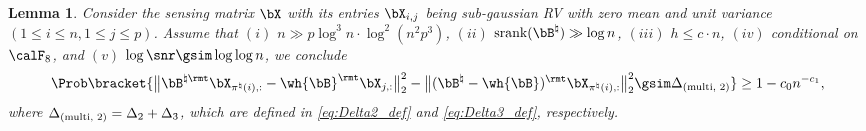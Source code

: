 \documentclass[11pt]{article}
\newtheorem{lemma}{Lemma}
\def \bBtrue {\bB^{\natural}}
\def\srank#1{\textup{srank}(#1)}
\begin{document}
\begin{lemma}
\label{lemma:rhs_general}
Consider the sensing matrix $\bX$ with its entries
$\bX_{i, j}$ being sub-gaussian RV with zero mean and unit variance $(1\leq i \leq n, 1\leq j \leq p)$.
Assume that $(i)$ $n\gg p \log^3 n\cdot \log^2(n^2 p^3)$,
$(ii)$ $\srank{\bBtrue} \gg \log n$, $(iii)$ $h\leq c\cdot  n$,
$(iv)$ conditional on $\calF_8$,
and $(v)$ $\log \snr \gsim \log \log n$,
we conclude
\[
\Prob\bracket{\big\|\bB^{\natural \rmt}\bX_{\pi^{\natural}(i), :} - \wh{\bB}^{\rmt}\bX_{j, :} \big\|_{2}^2
-  \big\|(\bBtrue - \wh{\bB})^{\rmt} \bX_{\pi^{\natural}(i), : } \big\|_{2}^2
\gsim \Delta_{(\textup{multi, 2})}} \geq 1 - c_0 n^{-c_1},
\]
where $\Delta_{(\textup{multi, 2})} = \Delta_2 + \Delta_3$, which are defined in
\eqref{eq:Delta2_def} and \eqref{eq:Delta3_def}, respectively.
\end{lemma}
\end{document}
